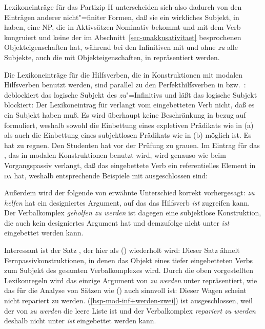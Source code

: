 {Lexikoneinträge für das Partizip II unterscheiden sich also dadurch von den Einträgen
anderer nicht"=finiter Formen, daß sie ein wirkliches Subjekt, in \subj haben, \dash eine NP, die in
Aktivsätzen Nominativ bekommt und mit dem Verb kongruiert und keine der im
Abschnitt~\ref{sec-unakkusativitaet} besprochenen Objekteigenschaften hat,
während bei den Infinitiven mit und ohne \emph{zu} alle Subjekte, \dash auch die mit
Objekteigenschaften, in \subj repräsentiert werden.

Die Lexikoneinträge für die Hilfsverben, die in Konstruktionen mit modalen Hilfsverben
benutzt werden, sind parallel zu den Perfekthilfsverben in  bzw.\ : 
\haben deblockiert das logische Subjekt des \emph{zu}"=Infinitivs und \sein läßt
das logische Subjekt blockiert: Der Lexikoneintrag für \haben verlangt vom eingebetteten
Verb nicht, daß es ein Subjekt haben muß. Es wird überhaupt keine Beschränkung in bezug auf \subj
formuliert, weshalb sowohl die Einbettung eines expletiven Prädikats 
wie in (a) als auch die Einbettung eines subjektlosen Prädikats wie in (b) möglich ist.
\eal
\ex 
Es hat zu regnen.
\ex 
Den Studenten hat vor der Prüfung zu grauen.
\zl
Im Eintrag für das \sein, das in modalen Konstruktionen benutzt wird, wird genauso wie beim Vorgangspassiv
verlangt, daß das eingebettete Verb ein referentielles Element in \textsc{da} hat, weshalb
entsprechende Beispiele mit \sein ausgeschlossen sind:
\eal
{}
\zl

\noindent
Außerdem wird der folgende von \citet[]{Haider90b} erwähnte Unterschied 
korrekt vorhergesagt:
\eal
{}
\zl
\emph{zu helfen} hat ein designiertes Argument, auf das das Hilfsverb \emph{ist} zugreifen kann.
Der Verbalkomplex \emph{geholfen zu werden} ist dagegen eine subjektlose Konstruktion,
die auch kein designiertes Argument hat und demzufolge nicht unter \emph{ist} eingebettet
werden kann.

Interessant ist der Satz , der hier als () wiederholt wird:
\z
Dieser Satz ähnelt Fernpassivkonstruktionen, in denen das Objekt eines tiefer eingebetteten
Verbs zum Subjekt des gesamten Verbalkomplexes wird. Durch die oben vorgestellten Lexikonregeln
wird das einzige Argument von \emph{zu werden} unter \subj repräsentiert, wie das für
die Analyse von Sätzen wie () auch sinnvoll ist:
\ea
Dieser Wagen scheint nicht repariert zu werden.
\z
(\ref{bsp-mod-inf+werden-zwei}) ist ausgeschlossen, weil der \daw von \emph{zu werden} die
leere Liste ist und der Verbalkomplex \emph{repariert zu werden} deshalb nicht unter \emph{ist}
eingebettet werden kann.

}
